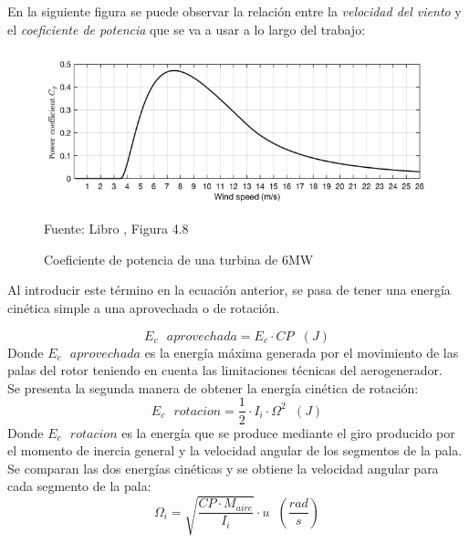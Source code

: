 En la siguiente figura se puede observar la relación entre la \textit{velocidad del viento} y el \textit{coeficiente de potencia} que se va a usar a lo largo del trabajo:

\begin{figure}[H]
    \centering
    \includegraphics[width=1\textwidth]{images/CP de una turbina de 6MW.PNG}
    \caption{Coeficiente de potencia de una turbina de 6MW}
    Fuente: Libro \cite{NEILL201883}, Figura 4.8
    \label{fig:coef_potencias_6MW}
\end{figure}


Al introducir este término en la ecuación anterior, se pasa de tener una energía cinética simple a una aprovechada o de rotación.

\begin{equation}
    E_c \text{ } aprovechada = E_c \cdot CP \hspace{7pt} (J)
\end{equation}
Donde $E_c \text{ } aprovechada$ es la energía máxima generada por el movimiento de las palas del rotor teniendo en cuenta las limitaciones técnicas del aerogenerador.\\

Se presenta la segunda manera de obtener la energía cinética de rotación:
\begin{equation}
    E_c  \text{ } rotacion = \dfrac{1}{2} \cdot I_i \cdot \Omega^2  \hspace{7pt} (J)
\end{equation}
Donde $E_c \text{ } rotacion$ es la energía que se produce mediante el giro producido por el momento de inercia general y la velocidad angular de los segmentos de la pala. \\

Se comparan las dos energías cinéticas y se obtiene la velocidad angular para cada segmento de la pala:
\begin{equation}
    \Omega_i = \sqrt{\dfrac{CP \cdot M_{aire}}{I_i}} \cdot u  \hspace{7pt} (\dfrac{rad}{s})
\end{equation}


